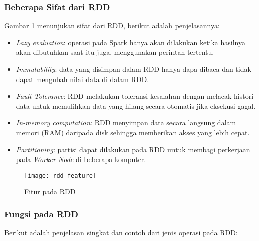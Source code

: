 \subsubsection{Beberapa Sifat dari RDD}
\noindent Gambar \ref{fig:rdd_feature} menunjukan sifat dari RDD, berikut adalah penjelasannya:
\begin{itemize}
\item \textit{Lazy evaluation}: operasi pada Spark hanya akan dilakukan ketika hasilnya akan dibutuhkan saat itu juga, menggunakan perintah tertentu.

\item \textit{Immutability}: data yang disimpan dalam RDD hanya dapa dibaca dan tidak dapat mengubah nilai data di dalam RDD. 

\item \textit{Fault Tolerance}: RDD melakukan toleransi kesalahan dengan melacak histori data untuk memulihkan data yang hilang secara otomatis jika eksekusi gagal.

\item \textit{In-memory computation}: RDD menyimpan data secara langsung dalam memori (RAM) daripada disk sehingga memberikan akses yang lebih cepat.

\item \textit{Partitioning}: partisi dapat dilakukan pada RDD untuk membagi perkerjaan pada \textit{Worker Node} di beberapa komputer.
\end{itemize}

\begin{figure}[H]
	\centering
	\texttt{[image: rdd\_feature]}
	\caption{Fitur pada RDD}
	\label{fig:rdd_feature}
\end{figure}



\subsubsection{Fungsi pada RDD}
\label{sec:fungsi_rdd}
\noindent Berikut adalah penjelasan singkat dan contoh dari jenis operasi pada RDD:

